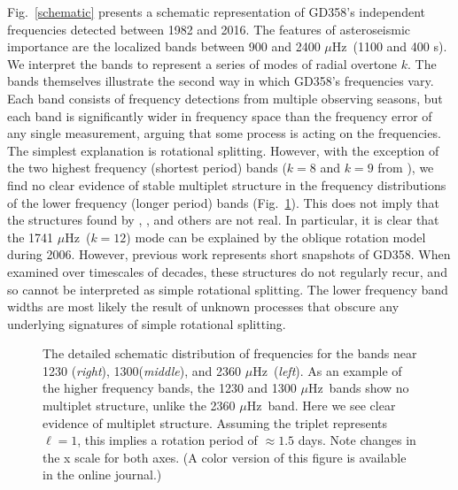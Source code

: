 \documentclass[12pt,preprint]{aastex}
\newcommand{\muHz}{\mbox{$\mu$Hz}}
\begin{document}
Fig.~\ref{schematic} presents a schematic representation of GD358's 
independent frequencies detected between 1982 and 2016.  
The features of asteroseismic importance are the localized bands between 900 and 2400
\muHz\ (1100 and 400 s). We interpret the bands to represent a series of modes of radial overtone $k$. The bands
themselves illustrate the second way in which GD358's frequencies vary. Each band consists of 
frequency detections from multiple observing seasons, but each band is significantly wider in 
frequency space than the frequency error of any single measurement, arguing that some process 
is acting on the frequencies. The simplest explanation is rotational splitting.  However, with the 
exception of the two highest frequency (shortest period) bands ($k=8$ and $k=9$ 
from \citet{Provencal09}), we find no clear evidence of stable multiplet structure in the frequency 
distributions of the lower frequency (longer period) bands (Fig.~\ref{rot}). This does not imply that the 
structures found by \cite{Winget94}, \cite{Kepler03}, \cite{Montgomery10} and others are not real. In 
particular, it is clear that the 1741 \muHz\ ($k=12$) mode can be explained by the oblique rotation model during 2006. However, 
previous work represents short snapshots of GD358. When examined over timescales of decades, these structures 
do not regularly recur, and so cannot be interpreted as simple rotational splitting. The lower frequency band widths 
are most likely the result of unknown processes that obscure any 
underlying signatures of simple rotational splitting. 
\begin{figure}
 \caption{The detailed schematic distribution of frequencies for the bands near 1230 ({\em{right}}), 
1300({\em{middle}}), and 2360 \muHz\ ({\em{left}}). As an example of the higher frequency bands, the 1230 and 
1300 \muHz\ bands  show no multiplet structure, unlike the 2360 \muHz\ band. Here we see clear evidence of multiplet 
 structure. Assuming the triplet represents
 $\ell=1$, this implies a rotation period of $\approx 1.5$ days. Note changes in the x scale for both axes.
 (A color version of this figure is available in the online journal.)
 \label{rot}}
\end{figure}
\end{document}
